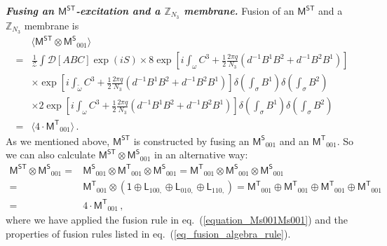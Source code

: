 \documentclass[11pt,nofootinbib,preprint]{revtex4-1}
\begin{document}
\textbf{\textit{Fusing an $\mathsf{M^{ST}}$-excitation and a $\mathbb{Z} _{N_3}$ membrane.}} 
Fusion of an $\mathsf{M^{ST}}$ and a $\mathbb{Z} _{N_3}$ membrane is
\begin{align}
	&\langle \mathsf{M^{ST}}\otimes \mathsf{M^S}_{001} \rangle \nonumber\\
	=&\frac{1}{\mathcal{Z}}\int{\mathcal{D} \left[ ABC\right]  \exp \left( iS \right)} 
	\times 8\exp \left[ i\int_{\omega}{C^3+\frac{1}{2}\frac{2\pi q}{N_3}\left( d^{-1}B^1B^2+d^{-1}B^2B^1 \right)} \right] \nonumber
	\\
	&\times \exp \left[ i\int_{\tilde{\omega}}{C^3+\frac{1}{2}\frac{2\pi q}{N_3}\left( d^{-1}B^1B^2+d^{-1}B^2B^1 \right)} \right] \delta \left( \int_{\sigma}{B^1} \right) \delta \left( \int_{\sigma}{B^2} \right) \nonumber
	\\
	&\times 2\exp \left[ i\int_{\omega}{C^3+\frac{1}{2}\frac{2\pi q}{N_3}\left( d^{-1}B^1B^2+d^{-1}B^2B^1 \right)} \right] \delta \left( \int_{\sigma}{B^1} \right) \delta \left( \int_{\sigma}{B^2} \right) \nonumber
	\\
	=&\langle 4\cdot \mathsf{M^T}_{001} \rangle \,.
\end{align}
As we mentioned above, $\mathsf{M^{ST}}$ is  constructed by fusing an $\mathsf{M^S}_{001}$ and an $\mathsf{M^T}_{001}$. So we can also calculate $\mathsf{M^{ST}}\otimes \mathsf{M^S}_{001}$ in an alternative way:
\begin{align}
	\mathsf{M^{ST}}\otimes \mathsf{M^S}_{001}=&\mathsf{M^S}_{001}\otimes \mathsf{M^T}_{001}\otimes \mathsf{M^S}_{001}=\mathsf{M^T}_{001}\otimes \mathsf{M^S}_{001}\otimes \mathsf{M^S}_{001} \nonumber
	\\
	=&\mathsf{M^T}_{001}\otimes \left(\mathsf{1}\oplus \mathsf{L}_{100,}\oplus \mathsf{L}_{010,}\oplus \mathsf{L}_{110,}\right) 
	=\mathsf{M^T}_{001}\oplus \mathsf{M^T}_{001}\oplus \mathsf{M^T}_{001}\oplus \mathsf{M^T}_{001} \nonumber
	\\
	=&4\cdot \mathsf{M^T}_{001}\,,
\end{align}
where we have applied the fusion rule in eq.~(\ref{equation_Ms001Ms001}) and the properties of fusion rules listed in eq.~(\ref{eq_fusion_algebra_rule}). 
 
\end{document}
